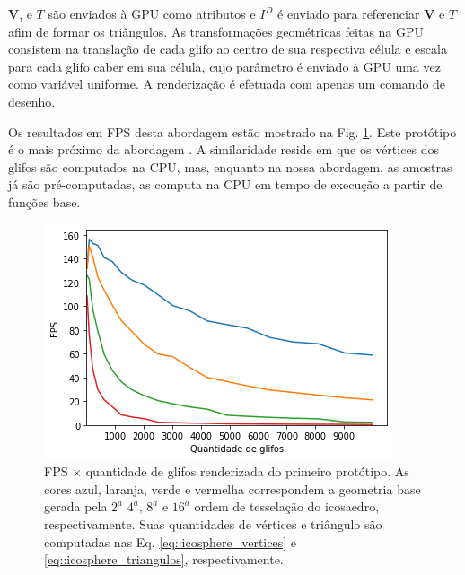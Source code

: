 \documentclass[
    12pt,                %
    oneside,            %
    a4paper,            %
    english,            %
    french,                %
    spanish,            %
    brazil                %
    ]{abntex2}
\begin{document}
$\mathbf{V}$, e $T$ são enviados à GPU como atributos e $I^D$ é enviado para referenciar $\mathbf{V}$ e $T$ afim de formar os triângulos. As transformações geométricas feitas na GPU consistem na translação de cada glifo ao centro de sua respectiva célula e escala para cada glifo caber em sua célula, cujo parâmetro é enviado à GPU uma vez como variável uniforme. A renderização é efetuada com apenas um comando de desenho.


Os resultados em FPS desta abordagem estão mostrado na Fig. \ref{fig::FPS_prototipo_1}. Este protótipo é o mais próximo da abordagem . A similaridade reside em que os vértices dos glifos são computados na CPU, mas, enquanto na nossa abordagem, as amostras já são pré-computadas,  as computa na CPU em tempo de execução a partir de funções base.%



\begin{figure}[htb]
    \centering
    \includegraphics[width=.65\linewidth, angle=0]{figs/Renderizacao_glifos_evolucao/FPS_prototipo1_Geral.png}
    \caption{FPS $\times$ quantidade de glifos renderizada do primeiro protótipo. As cores azul, laranja, verde e vermelha correspondem a geometria base gerada pela $2^{a}$ $4^{a}$, $8^{a}$ e $16^{a}$ ordem de tesselação do icosaedro, respectivamente. Suas quantidades de vértices e triângulo são computadas nas Eq. \ref{eq::icosphere_vertices} e \ref{eq::icosphere_triangulos}, respectivamente.}
    \label{fig::FPS_prototipo_1}
\end{figure}
\end{document}
